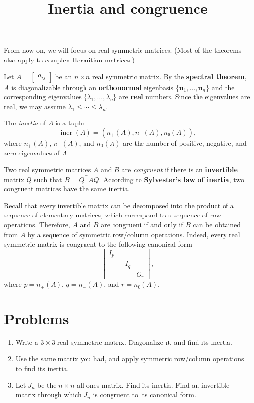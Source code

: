\documentclass{article}
\title{Inertia and congruence}
\date{\vspace{-1cm}}
\newcommand{\trans}{^\top}
\newcommand{\bu}{\mathbf{u}}
\newcommand{\iner}{\operatorname{iner}}
\theoremstyle{definition}
\begin{document}
\maketitle
\large

From now on, we will focus on real symmetric matrices.  (Most of the theorems also apply to complex Hermitian matrices.)

Let $A = \begin{bmatrix} a_{ij} \end{bmatrix}$ be an $n\times n$ real symmetric matrix.  By the \textbf{spectral theorem}, $A$ is diagonalizable through an \textbf{orthonormal} eigenbasis $\{\bu_1,\ldots,\bu_n\}$ and the corresponding eigenvalues $\{\lambda_1,\ldots,\lambda_n\}$ are \textbf{real} numbers.  Since the eigenvalues are real, we may assume $\lambda_1\leq \cdots \leq \lambda_n$.  

The \emph{inertia} of $A$ is a tuple 
\[\iner(A) = (n_+(A), n_-(A), n_0(A)),\]
where $n_+(A)$, $n_-(A)$, and $n_0(A)$ are the number of positive, negative, and zero eigenvalues of $A$.  

Two real symmetric matrices $A$ and $B$ are \emph{congruent} if there is an \textbf{invertible} matrix $Q$ such that $B = Q\trans AQ$.  According to \textbf{Sylvester's law of inertia}, two congruent matrices have the same inertia.

Recall that every invertible matrix can be decomposed into the product of a sequence of elementary matrices, which correspond to a sequence of row operations.  Therefore, $A$ and $B$ are congruent if and only if $B$ can be obtained from $A$ by a sequence of symmetric row/column operations.  Indeed, every real symmetric matrix is congruent to the following canonical form 
\[\begin{bmatrix}
 I_p & & \\
  & -I_q & \\
  & & O_r 
\end{bmatrix},\]
where $p = n_+(A)$, $q = n_-(A)$, and $r = n_0(A)$.  

\section*{Problems}
\begin{enumerate}
\setlength\itemsep{2em}
\item Write a $3\times 3$ real symmetric matrix.  Diagonalize it, and find its inertia.
\item Use the same matrix you had, and apply symmetric row/column operations to find its inertia.
\item Let $J_n$ be the $n\times n$ all-ones matrix.  Find its inertia.  Find an invertible matrix through which $J_n$ is congruent to its canonical form.
\end{enumerate}

\end{document}
